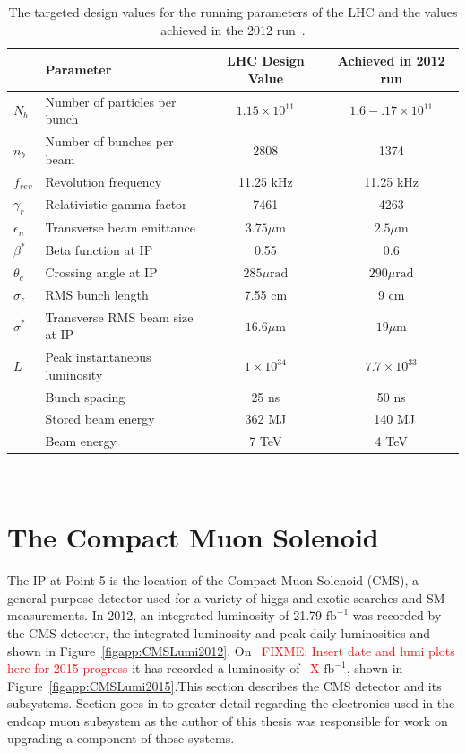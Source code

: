 \begin{table}[!Hhtbp]
\centering
\begin{tabular}{llcc}
\hline
{} & {Parameter}  & {LHC Design Value} &{Achieved in 2012 run}\\
\hline
\hline
{$N_b$} & {Number of particles per bunch} & {$1.15 \times 10^{11}$} &{$1.6-.17 \times 10^{11}$}\\
{$n_b$} & {Number of bunches per beam} & {2808} &{1374}\\
{$f_{rev}$} & {Revolution frequency} & {11.25 kHz} & {11.25 kHz}\\
{$\gamma_r$} & {Relativistic gamma factor} & {7461} &{4263}\\
{$\epsilon_n$} & {Transverse beam emittance} & {$3.75 \mu \text{m}$} &{$2.5 \mu \text{m}$}\\
{$\beta^*$} & {Beta function at IP} & {0.55} &{0.6}\\
{$\theta_c$} & {Crossing angle at IP} & {$285 \mu \text{rad}$} &{$290 \mu \text{rad}$}\\
{$\sigma_z$} & {RMS bunch length} & {7.55 cm} &{9 cm}\\
{$\sigma^*$} & {Transverse RMS beam size at IP} & {$16.6 \mu \text{m}$} &{$19 \mu \text{m}$}\\
{$L$} & {Peak instantaneous luminosity} & {$1 \times 10^{34}$} &{$7.7 \times 10^{33}$}\\
{} & {Bunch spacing} & {25 ns} &{50 ns}\\
{} & {Stored beam energy} & {362 MJ} &{~140 MJ}\\
{} & {Beam energy} & {7 TeV} &{4 TeV}\\
\hline
\end{tabular}
\\
\caption[LHC running parameters, designed and achieved in 2012.]{The targeted design values for the running parameters of the LHC and the values achieved in the 2012 run~\cite{LHCstatus}.}
\label{tab:LHCparams}
\end{table}


\section{The Compact Muon Solenoid}
\label{cmssection}

The IP at Point 5 is the location of the Compact Muon Solenoid (CMS), a general purpose detector used for a variety of higgs and exotic searches and SM measurements.  In 2012, an integrated luminosity of 21.79 $\text{fb}^{-1}$ was recorded by the CMS detector, the integrated luminosity and peak daily luminosities and shown in Figure~\ref{figapp:CMSLumi2012}.  On ~\textcolor{red}{FIXME: Insert date and lumi plots here for 2015 progress} it has recorded a luminosity of ~\textcolor{red}{X} $\text{fb}^{-1}$, shown in Figure~\ref{figapp:CMSLumi2015}.This section describes the CMS detector and its subsystems.  Section\label{cscelectronics} goes in to greater detail regarding the electronics used in the endcap muon subsystem as the author of this thesis was responsible for work on upgrading a component of those systems.  



